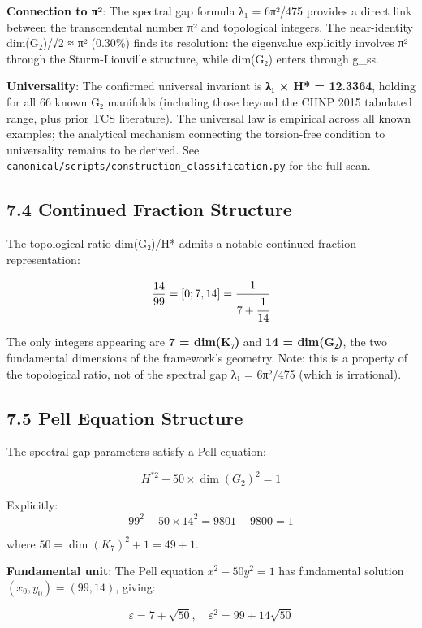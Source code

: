 \documentclass[11pt,a4paper]{article}
\begin{document}
\textbf{Connection to π²}: The spectral gap formula λ₁ = 6π²/475 provides a direct link between the transcendental number π² and topological integers. The near-identity dim(G₂)/√2 ≈ π² (0.30\%) finds its resolution: the eigenvalue explicitly involves π² through the Sturm-Liouville structure, while dim(G₂) enters through g\_\allowbreak{}ss.

\textbf{Universality}: The confirmed universal invariant is \textbf{λ₁ × H* = 12.3364}, holding for all 66 known G₂ manifolds (including those beyond the CHNP 2015 tabulated range, plus prior TCS literature). The universal law is empirical across all known examples; the analytical mechanism connecting the torsion-free condition to universality remains to be derived. See \texttt{canonical/\allowbreak{}scripts/\allowbreak{}construction\_\allowbreak{}classification.\allowbreak{}py} for the full scan.

\subsection{7.4 Continued Fraction Structure}\label{continued-fraction-structure}

The topological ratio dim(G₂)/H* admits a notable continued fraction representation:

\[\frac{14}{99} = [0; 7, 14] = \cfrac{1}{7 + \cfrac{1}{14}}\]

The only integers appearing are \textbf{7 = dim(K₇)} and \textbf{14 = dim(G₂)}, the two fundamental dimensions of the framework's geometry. Note: this is a property of the topological ratio, not of the spectral gap λ₁ = 6π²/475 (which is irrational).

\subsection{7.5 Pell Equation Structure}\label{pell-equation-structure}

The spectral gap parameters satisfy a Pell equation:

\[\boxed{H^{*2} - 50 \times \dim(G_2)^2 = 1}\]

Explicitly: \[99^2 - 50 \times 14^2 = 9801 - 9800 = 1\]

where \(50 = \dim(K_7)^2 + 1 = 49 + 1\).

\textbf{Fundamental unit}: The Pell equation \(x^2 - 50y^2 = 1\) has fundamental solution \((x_0, y_0) = (99, 14)\), giving:

\[\varepsilon = 7 + \sqrt{50}, \quad \varepsilon^2 = 99 + 14\sqrt{50}\]
\end{document}
